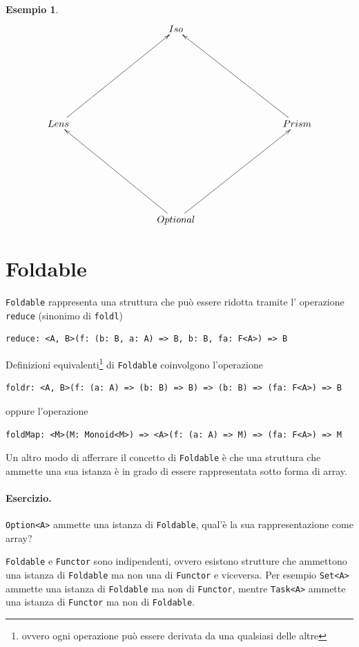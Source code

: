 \documentclass[12pt]{article}
\newtheorem{example}{Esempio}
\begin{document}
\begin{example}
\[
\xymatrixrowsep{3cm}
\xymatrixcolsep{3cm}
\xymatrix{
  & Iso \\
  Lens \ar[ur] & & Prism \ar[ul] \\
  & Optional \ar[ul] \ar[ur] \\
}
\]
\end{example}


\section{Foldable}

\texttt{Foldable} rappresenta una struttura che può essere ridotta tramite l' operazione \texttt{reduce} (sinonimo di \texttt{foldl})

\begin{verbatim}
reduce: <A, B>(f: (b: B, a: A) => B, b: B, fa: F<A>) => B
\end{verbatim}

Definizioni equivalenti\footnote{ovvero ogni operazione può essere derivata da una qualsiasi delle altre} di \texttt{Foldable} coinvolgono l'operazione

\begin{verbatim}
foldr: <A, B>(f: (a: A) => (b: B) => B) => (b: B) => (fa: F<A>) => B
\end{verbatim}

oppure l'operazione

\begin{verbatim}
foldMap: <M>(M: Monoid<M>) => <A>(f: (a: A) => M) => (fa: F<A>) => M
\end{verbatim}

Un altro modo di afferrare il concetto di \texttt{Foldable} è che una struttura che ammette una sua istanza
è in grado di essere rappresentata sotto forma di array.

\paragraph{Esercizio.} \texttt{Option<A>} ammette una istanza di \texttt{Foldable}, qual'è la sua rappresentazione come array?

\texttt{Foldable} e \texttt{Functor} sono indipendenti, ovvero esistono strutture che ammettono una istanza di \texttt{Foldable} ma non una di
\texttt{Functor} e viceversa. Per esempio \texttt{Set<A>} ammette una istanza di \texttt{Foldable} ma non di \texttt{Functor},
mentre \texttt{Task<A>} ammette una istanza di \texttt{Functor} ma non di \texttt{Foldable}.
\end{document}
